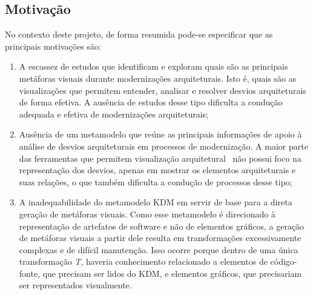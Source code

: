 \documentclass[12pt]{article}
\begin{document}
\subsection{Motivação}


No contexto deste projeto, de forma resumida pode-se especificar que as principais motivações são:

\begin{enumerate}

\item A escassez de estudos que identificam e exploram quais são as principais metáforas visuais durante modernizações arquiteturais. Isto é, quais são as visualizações que permitem entender, analisar e resolver desvios arquiteturais de forma efetiva. A ausência de estudos desse tipo dificulta a condução adequada e efetiva de modernizações arquiteturais;

\item Ausência de um metamodelo que reúne as principais informações de apoio à análise de desvios arquiteturais em processos de modernização. A maior parte das ferramentas que permitem visualização arquitetural~\cite{Maffort_2013, Knodel_2007, ArchJava_2202} não possui foco na representação dos desvios, apenas em mostrar os elementos arquiteturais e suas relações, o que também dificulta a condução de processos desse tipo;

\item A inadequabilidade do metamodelo KDM em servir de base para a direta geração de metáforas visuais. Como esse metamodelo é direcionado à representação de artefatos de software e não de elementos gráficos, a geração de metáforas visuais a partir dele resulta em transformações excessivamente complexas e de difícil manutenção. Isso ocorre porque dentro de uma única transformação \textit{T}, haveria conhecimento relacionado a elementos de código-fonte, que precisam ser lidos do KDM, e elementos gráficos, que precisariam ser representados visualmente.
\end{enumerate}
\end{document}
